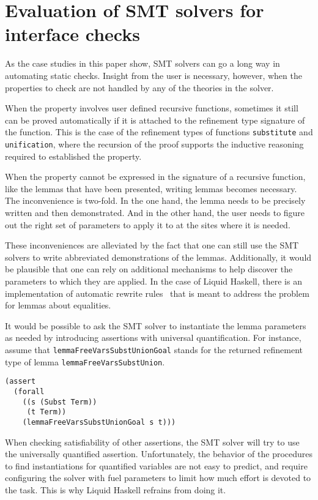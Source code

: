 \documentclass[acmtog, anonymous]{acmart}
\newcommand{\tc}[1]{{\small\texttt{#1}}}
\begin{document}
\section{Evaluation of SMT solvers for interface checks}
\label{SMT-solvers-for-interface-checks}

As the case studies in this paper show, SMT solvers can go a long way in
automating static checks. Insight from the user is necessary, however,
when the properties to check are not handled by any of the theories in the
solver.

When the property involves user defined recursive functions,
sometimes it still can be proved automatically if it is attached to the
refinement type signature of the function. This is the case of the refinement
types of functions \tc{substitute} and \tc{unification}, where the recursion
of the proof supports the inductive reasoning required to established the
property.

When the property cannot be expressed in the signature of a recursive function,
like the lemmas that have been presented, writing lemmas becomes necessary. The
inconvenience is two-fold. In the one hand, the lemma needs to be precisely
written and then demonstrated. And in the other hand, the user needs to figure
out the right set of parameters to apply it to at the sites where it is needed.

These inconveniences are alleviated by the fact that one can still use the
SMT solvers to write abbreviated demonstrations of the lemmas. Additionally,
it would be plausible that one can rely on additional mechanisms to help
discover the parameters to which they are applied. In the case of Liquid
Haskell, there is an implementation of automatic rewrite rules~\cite{grannan22}
that is meant to address the problem for lemmas about equalities.

It would be possible to ask the SMT solver to instantiate the lemma parameters
as needed by introducing assertions with universal quantification. For instance,
assume that \tc{lemma\-FreeVars\-Subst\-Union\-Goal} stands for the returned
refinement type of lemma \tc{lemma\-FreeVars\-Subst\-Union}.

\begin{verbatim}
(assert
  (forall
    ((s (Subst Term))
     (t Term))
    (lemmaFreeVarsSubstUnionGoal s t)))
\end{verbatim}

When checking satisfiability of other assertions, the SMT solver
will try to use the universally quantified assertion. Unfortunately, the
behavior of the procedures to find instantiations for quantified variables are
not easy to predict, and require configuring the solver with fuel parameters to
limit how much effort is devoted to the task. This is why Liquid Haskell refrains
from doing it.
\end{document}
